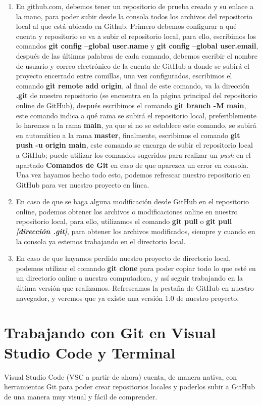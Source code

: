 \begin{enumerate}
    \item En github.com, debemos tener un repositorio de prueba creado y su enlace a la mano, para poder subir desde la consola todos los archivos del repositorio local al que está ubicado en Github. Primero debemos configurar a qué cuenta y repositorio se va a subir el repositorio local, para ello, escribimos los comandos \textbf{git config –global user.name} y \textbf{git config –global user.email}, después de las últimas palabras de cada comando, debemos escribir el nombre de usuario y correo electrónico de la cuenta de GitHub a donde se subirá el proyecto encerrado entre comillas, una vez configurados, escribimos el comando \textbf{git remote add origin}, al final de este comando, va la dirección \textbf{.git} de nuestro repositorio (se encuentra en la página principal del repositorio online de GitHub), después escribimos el comando \textbf{git branch -M main}, este comando indica a qué rama se subirá el repositorio local, preferiblemente lo haremos a la rama \textbf{main}, ya que si no se establece este comando, se subirá en automático a la rama \textbf{master}, finalmente, escribimos el comando \textbf{git push -u origin main}, este comando se encarga de subir el repositorio local a GitHub; puede utilizar los comandos sugeridos para realizar un \textit{push} en el apartado \textbf{Comandos de Git} en caso de que aparezca un error en consola. Una vez hayamos hecho todo esto, podemos refrescar nuestro repositorio en GitHub para ver nuestro proyecto en línea.
    \item En caso de que se haga alguna modificación desde GitHub en el repositorio online, podemos obtener los archivos o modificaciones online en nuestro repositorio local, para ello, utilizamos el comando \textbf{git pull} o \textbf{git pull \textit{[dirección .git]}}, para obtener los archivos modificados, siempre y cuando en la consola ya estemos trabajando en el directorio local.
    \item En caso de que hayamos perdido nuestro proyecto de directorio local, podemos utilizar el comando \textbf{git clone} para poder copiar todo lo que esté en un directorio online a nuestra computadora, y así seguir trabajando en la última versión que realizamos. Refrescamos la pestaña de GitHub en nuestro navegador, y veremos que ya existe una versión 1.0 de nuestro proyecto.
\end{enumerate}





\section{Trabajando con Git en Visual Studio Code y Terminal}
\hspace{0.55cm}Visual Studio Code (VSC a partir de ahora) cuenta, de manera nativa, con herramientas Git para poder crear repositorios locales y poderlos subir a GitHub de una manera muy visual y fácil de comprender.

